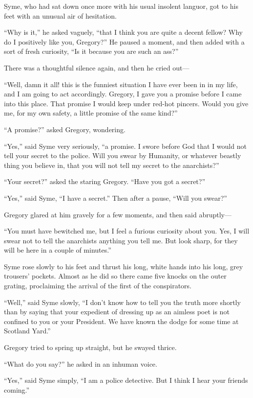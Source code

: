 Syme, who had sat down once more with his usual insolent languor, got to his feet with an unusual air of hesitation.

“Why is it,” he asked vaguely, “that I think you are quite a decent fellow? Why do I positively like you, Gregory?” He paused a moment, and then added with a sort of fresh curiosity, “Is it because you are such an ass?”

There was a thoughtful silence again, and then he cried out⁠—

“Well, damn it all! this is the funniest situation I have ever been in in my life, and I am going to act accordingly. Gregory, I gave you a promise before I came into this place. That promise I would keep under red-hot pincers. Would you give me, for my own safety, a little promise of the same kind?”

“A promise?” asked Gregory, wondering.

“Yes,” said Syme very seriously, “a promise. I swore before God that I would not tell your secret to the police. Will you swear by Humanity, or whatever beastly thing you believe in, that you will not tell my secret to the anarchists?”

“Your secret?” asked the staring Gregory. “Have you got a secret?”

“Yes,” said Syme, “I have a secret.” Then after a pause, “Will you swear?”

Gregory glared at him gravely for a few moments, and then said abruptly⁠—

“You must have bewitched me, but I feel a furious curiosity about you. Yes, I will swear not to tell the anarchists anything you tell me. But look sharp, for they will be here in a couple of minutes.”

Syme rose slowly to his feet and thrust his long, white hands into his long, grey trousers’ pockets. Almost as he did so there came five knocks on the outer grating, proclaiming the arrival of the first of the conspirators.

“Well,” said Syme slowly, “I don’t know how to tell you the truth more shortly than by saying that your expedient of dressing up as an aimless poet is not confined to you or your President. We have known the dodge for some time at Scotland Yard.”

Gregory tried to spring up straight, but he swayed thrice.

“What do you say?” he asked in an inhuman voice.

“Yes,” said Syme simply, “I am a police detective. But I think I hear your friends coming.”

